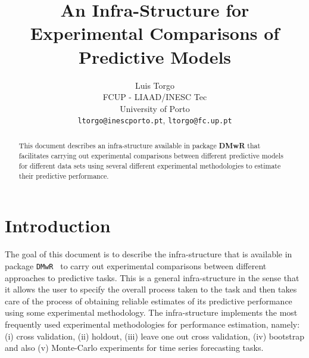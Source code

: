 \documentclass[10pt,a4paper]{article}
\author{Luis Torgo\\FCUP - LIAAD/INESC Tec\\University of Porto\\
  \texttt{ltorgo@inescporto.pt}, \texttt{ltorgo@fc.up.pt}}
\title{An Infra-Structure for\\ Experimental Comparisons of Predictive Models}
\newcommand{\DR}{package \texttt{DMwR}}
\begin{document}
  
\maketitle

\begin{abstract}
  This document describes an infra-structure available in package
  \textbf{DMwR} that facilitates carrying out experimental comparisons
  between different predictive models for different data sets using
  several different experimental methodologies to estimate their
  predictive performance.
\end{abstract}

\section{Introduction}

The goal of this document is to describe the infra-structure that is
available in \DR~\cite{Tor10} to carry out experimental comparisons
between different approaches to predictive tasks. This is a general
infra-structure in the sense that it allows the user to specify the
overall process taken to the task and then takes care of the process
of obtaining reliable estimates of its predictive performance
using  some experimental methodology. The infra-structure
implements the most frequently used experimental methodologies for
performance estimation, namely: (i) cross validation, (ii) holdout,
(iii) leave one out cross validation, (iv) bootstrap and also (v)
Monte-Carlo experiments for time series forecasting tasks.
\end{document}
